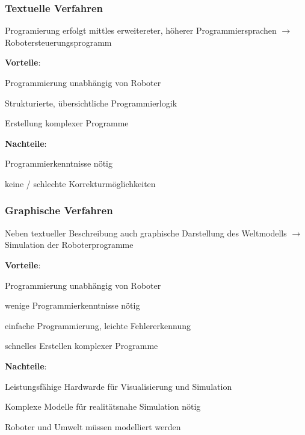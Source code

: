\subsubsection{Textuelle Verfahren}
\begin{compactitem}
    \item Programierung erfolgt mittles erweitereter, höherer Programmiersprachen $\rightarrow$
    Robotersteuerungsprogramm
    \item \textbf{Vorteile}:
    \begin{compactitem}
        \item Programmierung unabhängig von Roboter
        \item Strukturierte, übersichtliche Programmierlogik
        \item Erstellung komplexer Programme
    \end{compactitem}
    \item \textbf{Nachteile}:
    \begin{compactitem}
        \item Programmierkenntnisse nötig
        \item keine / schlechte Korrekturmöglichkeiten
    \end{compactitem}
\end{compactitem}
\subsubsection{Graphische Verfahren }
\begin{compactitem}
    \item Neben textueller Beschreibung auch graphische Darstellung des Weltmodells $\rightarrow$ Simulation der
    Roboterprogramme
    \item \textbf{Vorteile}:
    \begin{compactitem}
        \item Programmierung unabhängig von Roboter
        \item wenige Programmierkenntnisse nötig
        \item einfache Programmierung, leichte Fehlererkennung
        \item schnelles Erstellen komplexer Programme
    \end{compactitem}
    \item \textbf{Nachteile}:
    \begin{compactitem}
        \item Leistungsfähige Hardwarde für Visualisierung und Simulation
        \item Komplexe Modelle für realitätsnahe Simulation nötig
        \item Roboter und Umwelt müssen modelliert werden
    \end{compactitem}
\end{compactitem}

